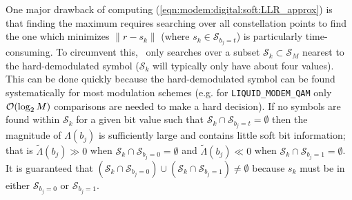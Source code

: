 % 
%
One major drawback of computing
(\ref{eqn:modem:digital:soft:LLR_approx}) is that finding the maximum
requires searching over all constellation points to find the one which
minimizes $\|r-s_k\|$
(where $s_k \in \mathcal{S}_{b_j=t}$) is particularly time-consuming.
To circumvent this, \liquid\ only searches over a subset
$\mathcal{S}_k \subset \mathcal{S}_M$ nearest to the
hard-demodulated symbol
($\mathcal{S}_k$ will typically only have about four values).
This can be done quickly because the hard-demodulated symbol can be
found systematically for most modulation schemes
(e.g. for {\tt LIQUID\_MODEM\_QAM} only $\mathcal{O}(\log_2 M)$ comparisons are
needed to make a hard decision).
%
If no symbols are found within $\mathcal{S}_k$ for a given bit value
such that $\mathcal{S}_k \cap \mathcal{S}_{b_j=t} = \emptyset$
then the magnitude of $\Lambda(b_j)$ is sufficiently large
and contains little soft bit information;
that is
$\tilde{\Lambda}(b_j) \gg 0$ when $\mathcal{S}_k \cap \mathcal{S}_{b_j=0} = \emptyset$
and
$\tilde{\Lambda}(b_j) \ll 0$ when $\mathcal{S}_k \cap \mathcal{S}_{b_j=1} = \emptyset$.
%
It is guaranteed that
$   \left( \mathcal{S}_k \cap \mathcal{S}_{b_j=0}\right)
        \cup
    \left( \mathcal{S}_k \cap \mathcal{S}_{b_j=1}\right)
    \neq \emptyset $
because $s_k$ must be in either $\mathcal{S}_{b_j=0}$ or
$\mathcal{S}_{b_j=1}$.
%

